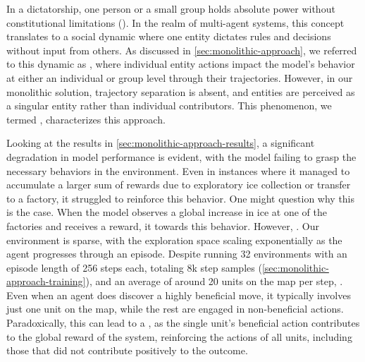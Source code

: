 \noindent In a dictatorship, one person or a small group holds absolute power without constitutional limitations (\cite{VocabularyDictatorship}). In the realm of multi-agent systems, this concept translates to a social dynamic where one entity dictates rules and decisions without input from others. As discussed in \autoref{sec:monolithic-approach}, we referred to this dynamic as , where individual entity actions impact the model's behavior at either an individual or group level through their trajectories. However, in our monolithic solution, trajectory separation is absent, and entities are perceived as a singular entity rather than individual contributors. This phenomenon, we termed , characterizes this approach.

\bigskip

\noindent Looking at the results in \autoref{sec:monolithic-approach-results}, a significant degradation in model performance is evident, with the model failing to grasp the necessary behaviors in the environment. Even in instances where it managed to accumulate a larger sum of rewards due to exploratory ice collection or transfer to a factory, it struggled to reinforce this behavior. One might question why this is the case. When the model observes a global increase in ice at one of the factories and receives a reward, it  towards this behavior. However, . Our environment is sparse, with the exploration space scaling exponentially as the agent progresses through an episode. Despite running 32 environments with an episode length of 256 steps each, totaling 8k step samples (\autoref{sec:monolithic-approach-training}), and an average of around 20 units on the map per step, . Even when an agent does discover a highly beneficial move, it typically involves just one unit on the map, while the rest are engaged in non-beneficial actions. Paradoxically, this can lead to a , as the single unit's beneficial action contributes to the global reward of the system, reinforcing the actions of all units, including those that did not contribute positively to the outcome.

\bigskip

